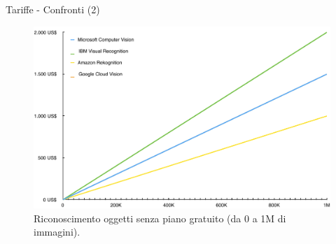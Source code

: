 %
\begin{frame}[t]{Tariffe - Confronti (2)}
	\begin{figure}[h]
	\centering
	    \includegraphics[width=.6\paperwidth,keepaspectratio=true]{../../doc/img/grafico2}
		{\tiny \caption{Riconoscimento oggetti senza piano gratuito (da 0 a 1M di immagini).}}
		\label{fig:tariffe-riconoscimento-oggetti-senza-gratuito}
	\end{figure}
\end{frame}
%
